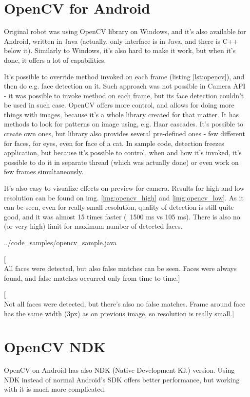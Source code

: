 \section{OpenCV for Android}
Original robot was using OpenCV library on Windows, and it's also available for
Android, written in Java (actually, only interface is in Java, and there is
C++ below it).
Similarly to Windows, it's also hard to make it work, but when it's done, it offers a lot of capabilities.

It's possible to override method invoked on each frame (listing
\ref{lst:opencv}), and then do e.g. face detection on it.
Such approach was not possible in Camera API - it was possible to invoke method
on each frame, but its face detection couldn't be used in such case.
OpenCV offers more control, and allows for doing more things with images,
because it's a whole library created for that matter.
It has methods to look for patterns on image using, e.g. Haar cascades.
It's possible to create own ones, but library also provides several pre-defined
ones - few different for faces, for eyes, even for face of a cat.
In sample code, detection freezes application, but because it's possible to
control, when and how it's invoked, it's possible to do it in separate thread
(which was actually done) or even work on few frames simultaneously.

It's also easy to visualize effects on preview for camera. Results for high and
low resolution can be found on img. \ref{img:opencv_high} and
\ref{img:opencv_low}.
As it can be seen, even for really small resolution, quality of detection is
still quite good, and it was almost 15 times faster (~1500 ms vs 105 ms).
There is also no (or very high) limit for maximum number of detected faces.


{../code_samples/opencv_sample.java}

[\\All faces were detected, but also false matches can be seen. Faces were
always found, and false matches occurred only from time to time.]

[\\Not all faces were detected, but there's also no false matches. Frame
around face has the same width (3px) as on previous image, so resolution is
really small.]

\section{OpenCV NDK}
OpenCV on Android has also NDK (Native Development Kit) version.
Using NDK instead of normal Android's SDK offers better performance, but working
with it is much more complicated.

